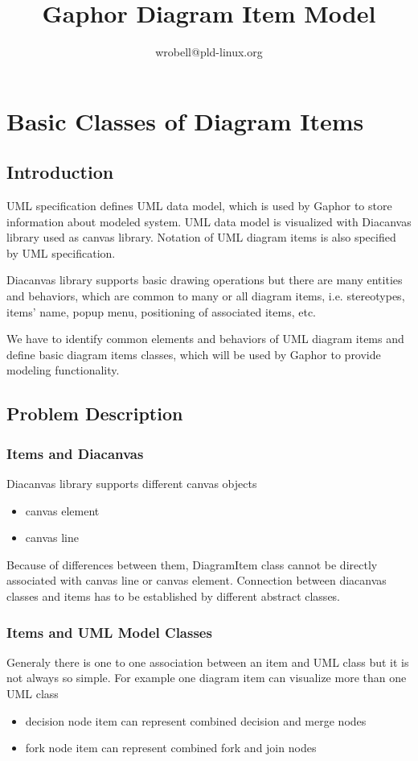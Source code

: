 \documentclass[draft]{book}
\title{Gaphor Diagram Item Model}
\author{wrobell@pld-linux.org}
\begin{document}
\maketitle

\chapter{Basic Classes of Diagram Items}
\section{Introduction}
UML specification defines UML data model, which is used by Gaphor to store
information about modeled system. UML data model is visualized with
Diacanvas library used as canvas library. Notation
of UML diagram items is also specified by UML specification.

Diacanvas library supports basic drawing operations but there are many
entities and behaviors, which are common to many or all diagram items, i.e.
stereotypes, items' name, popup menu, positioning of associated items, etc.

We have to identify common elements and behaviors of UML diagram items
and define basic diagram items classes, which will be used
by Gaphor to provide modeling functionality.

\section{Problem Description}

\subsection{Items and Diacanvas}\label{gaphor:basic:itemsandcanvas}
Diacanvas library supports different canvas objects
\begin{itemize}
\item canvas element
\item canvas line
\end{itemize}

Because of differences between them, DiagramItem class cannot be directly
associated with canvas line or canvas element. Connection between diacanvas
classes and items has to be established by different abstract classes.

\subsection{Items and UML Model Classes}
Generaly there is one to one association between an item and UML class
but it is not always so simple. 
For example one diagram item can visualize more than one UML class
\begin{itemize}
\item decision node item can represent combined decision and merge nodes
\item fork node item can represent combined fork and join nodes 
\end{itemize}
\end{document}

